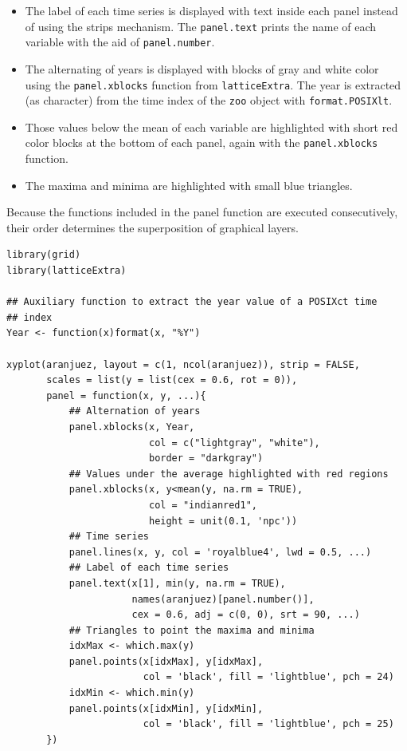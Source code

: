 \documentclass[smallroyalvopaper]{memoir}
\begin{document}
\begin{itemize}
\item The label of each time series is displayed with text inside each
panel instead of using the strips mechanism. The \texttt{panel.text}
prints the name of each variable with the aid of \texttt{panel.number}.
\item The alternating of years is displayed with blocks of gray and
white color using the \texttt{panel.xblocks} function from
\texttt{latticeExtra}. The year is extracted (as character) from the
time index of the \texttt{zoo} object with \texttt{format.POSIXlt}.
\item Those values below the mean of each variable are highlighted
with short red color blocks at the bottom of each panel, again
with the \texttt{panel.xblocks} function.
\item The maxima and minima are highlighted with small blue triangles.
\end{itemize}

Because the functions included in the panel function are executed
consecutively, their order determines the superposition of graphical
layers.



\lstset{language=r,label= ,caption= ,captionpos=b,numbers=none}
\begin{lstlisting}
library(grid)
library(latticeExtra)
  
## Auxiliary function to extract the year value of a POSIXct time
## index
Year <- function(x)format(x, "%Y")
  
xyplot(aranjuez, layout = c(1, ncol(aranjuez)), strip = FALSE,
       scales = list(y = list(cex = 0.6, rot = 0)),
       panel = function(x, y, ...){
           ## Alternation of years
           panel.xblocks(x, Year,
                         col = c("lightgray", "white"),
                         border = "darkgray")
           ## Values under the average highlighted with red regions
           panel.xblocks(x, y<mean(y, na.rm = TRUE),
                         col = "indianred1",
                         height = unit(0.1, 'npc'))
           ## Time series
           panel.lines(x, y, col = 'royalblue4', lwd = 0.5, ...)
           ## Label of each time series
           panel.text(x[1], min(y, na.rm = TRUE),
                      names(aranjuez)[panel.number()],
                      cex = 0.6, adj = c(0, 0), srt = 90, ...)
           ## Triangles to point the maxima and minima 
           idxMax <- which.max(y)
           panel.points(x[idxMax], y[idxMax],
                        col = 'black', fill = 'lightblue', pch = 24)
           idxMin <- which.min(y)
           panel.points(x[idxMin], y[idxMin],
                        col = 'black', fill = 'lightblue', pch = 25)
       })
\end{lstlisting}
\end{document}
